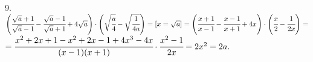 9. $\left(\cfrac{\sqrt{a}+1}{\sqrt{a}-1}-\cfrac{\sqrt{a}-1}{\sqrt{a}+1}+4\sqrt{a}\right)\cdot
\left(\sqrt{\cfrac{a}{4}}-\sqrt{\cfrac{1}{4a}}\right)=[x=\sqrt{a}]=
\left(\cfrac{x+1}{x-1}-\cfrac{x-1}{x+1}+4x\right)\cdot
\left(\cfrac{x}{2}-\cfrac{1}{2x}\right)=$\\
$=\cfrac{x^2+2x+1-x^2+2x-1+4x^3-4x}{(x-1)(x+1)}\cdot\cfrac{x^2-1}{2x}=2x^2=2a.$\\
